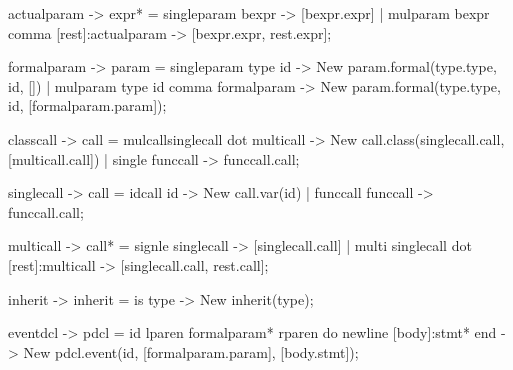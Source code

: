     actualparam {-> expr*}  =   {singleparam} bexpr                                     {-> [bexpr.expr]}
                            |   {mulparam} bexpr comma [rest]:actualparam               {-> [bexpr.expr, rest.expr]};

    formalparam {-> param}  =   {singleparam} type id                                   {-> New param.formal(type.type, id, [])}
                            |   {mulparam} type id comma formalparam                    {-> New param.formal(type.type, id, [formalparam.param])};

    classcall   {-> call}   =   {mulcall}singlecall dot multicall                               {-> New call.class(singlecall.call, [multicall.call])}
                            |   {single} funccall                                       {-> funccall.call};

    singlecall  {-> call}   =   {idcall} id                                             {-> New call.var(id)}
                            |   {funccall} funccall                                     {-> funccall.call};

    multicall   {-> call*}  =   {signle} singlecall                                     {-> [singlecall.call]}
                            |   {multi} singlecall dot [rest]:multicall                 {-> [singlecall.call, rest.call]};

    inherit     {-> inherit}    =    is type                                            {-> New inherit(type)};

    eventdcl    {-> pdcl}  =   id lparen formalparam* rparen do newline [body]:stmt* end          {-> New pdcl.event(id, [formalparam.param], [body.stmt])};
